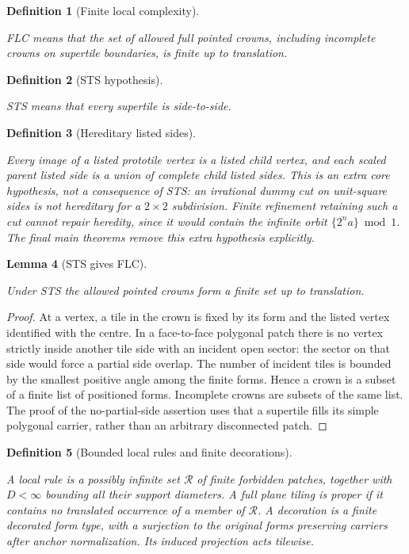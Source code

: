 \documentclass[11pt,a4paper]{article}
\newtheorem{definition}{Definition}[section]
\newtheorem{lemma}[definition]{Lemma}
\theoremstyle{remark}
\newcommand{\lean}[1]{}
\newcommand{\uses}[1]{}
\begin{document}
\begin{definition}[Finite local complexity]\label{def:flc}
\lean{Tilings.Substitution.FLC}
\uses{def:crown}
FLC means that the set of allowed full pointed crowns, including incomplete
crowns on supertile boundaries, is finite up to translation.
\end{definition}

\begin{definition}[STS hypothesis]\label{def:sts}
\lean{Tilings.Substitution.STS}
\uses{def:tiling,def:substitution}
STS means that every supertile is side-to-side.
\end{definition}


\begin{definition}[Hereditary listed sides]\label{def:hereditary}
\lean{Tilings.Substitution.HereditarySides}
\uses{def:substitution,def:sts}
Every image of a listed prototile vertex is a listed child vertex, and each
scaled parent listed side is a union of complete child listed sides.
This is an extra core hypothesis, not a consequence of STS: an irrational
dummy cut on unit-square sides is not hereditary for a $2\times2$ subdivision.
Finite refinement retaining such a cut cannot repair heredity, since it
would contain the infinite orbit $\{2^n a\}\bmod1$.
The final main theorems remove this extra hypothesis explicitly.
\end{definition}

\begin{lemma}[STS gives FLC]\label{lem:sts-flc}
\lean{Tilings.Substitution.STS.finite_crowns}
\uses{def:sts,def:flc}
Under STS the allowed pointed crowns form a finite set up to translation.
\end{lemma}
\begin{proof}
At a vertex, a tile in the crown is fixed by its form and the listed vertex
identified with the centre. In a face-to-face polygonal patch there is no
vertex strictly inside another tile side with an incident open sector:
the sector on that side would force a partial side overlap. The number of
incident tiles is bounded by the smallest positive angle among the finite
forms. Hence a crown is a subset of a finite list of positioned forms.
Incomplete crowns are subsets of the same list.
The proof of the no-partial-side assertion uses that a supertile fills its
simple polygonal carrier, rather than an arbitrary disconnected patch.
\end{proof}

\begin{definition}[Bounded local rules and finite decorations]\label{def:localrule}
\lean{Tilings.LocalRule,Tilings.Decoration,Tilings.Proper}
\uses{def:tiling}
A local rule is a possibly infinite set $\mathcal R$ of finite forbidden
patches, together with $D<\infty$ bounding all their support diameters.
A full plane tiling is proper if it contains no translated occurrence of
a member of $\mathcal R$. A decoration is a finite decorated form type,
with a surjection to the original forms preserving carriers after anchor
normalization. Its induced projection acts tilewise.
\end{definition}
\end{document}
